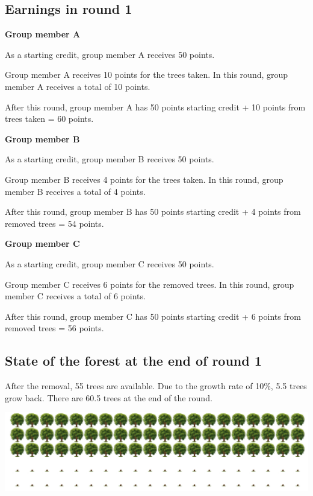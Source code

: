 \subsection*{Earnings in round 1}

\textbf{Group member A}

\noindent As a starting credit, group member A receives 50 points.

\noindent Group member A receives 10 points for the trees taken. In this round, group member A receives a total of 10 points.

\noindent After this round, group member A has 50 points starting credit + 10 points from trees taken = 60 points.

\noindent \textbf{Group member B}

\noindent As a starting credit, group member B receives 50 points.

\noindent Group member B receives 4 points for the trees taken. In this round, group member B receives a total of 4 points.

\noindent After this round, group member B has 50 points starting credit + 4 points from removed trees = 54 points.

\noindent\textbf{Group member C}

\noindent As a starting credit, group member C receives 50 points.

\noindent Group member C receives 6 points for the removed trees. In this round, group member C receives a total of 6 points.

\noindent After this round, group member C has 50 points starting credit + 6 points from removed trees = 56 points.

\subsection*{State of the forest at the end of round 1}

After the removal, 55 trees are available. Due to the growth rate of 10\%, 5.5 trees grow back. There are 60.5 trees at the end of the round.

\begin{center}
   \includegraphics[width=16cm]{../bld/graphs/A. Round1c.png}
\end{center}


